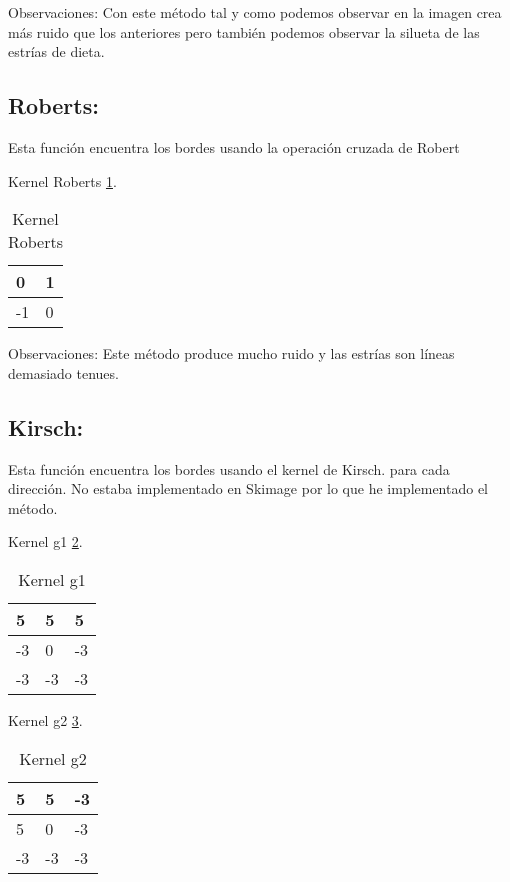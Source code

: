 Observaciones: 
Con este método tal y como podemos observar en la imagen crea más ruido que los anteriores pero también podemos observar la silueta de las estrías de dieta.


\subsection{Roberts:}

Esta función encuentra los bordes usando la operación cruzada de Robert

Kernel Roberts \ref{F_k5}.
\begin{table}[]
	\centering
	\caption{Kernel Roberts}
	\label{F_k5}
	\begin{tabular}{|l|l|}
		\hline
		0  & 1 \\ \hline
		-1 & 0 \\ \hline
	\end{tabular}
\end{table}




Observaciones:
Este método produce mucho ruido y las estrías son líneas demasiado tenues.

\subsection{Kirsch:}
Esta función encuentra los bordes usando el kernel de Kirsch.
para cada dirección.
No estaba implementado en Skimage por lo que he implementado el método.

Kernel g1 \ref{F_k6_1}.
\begin{table}[]
	\centering
	\caption{Kernel g1}
	\label{F_k6_1}
	\begin{tabular}{|l|l|l|}
		\hline
		5  & 5  & 5  \\ \hline
		-3 & 0  & -3 \\ \hline
		-3 & -3 & -3 \\ \hline
	\end{tabular}
\end{table}

Kernel g2 \ref{F_k6_2}.
\begin{table}[]
	\centering
	\caption{Kernel g2}
	\label{F_k6_2}
	\begin{tabular}{|l|l|l|}
		\hline
		5  & 5  & -3  \\ \hline
		5 & 0  & -3 \\ \hline
		-3 & -3 & -3 \\ \hline
	\end{tabular}
\end{table}


